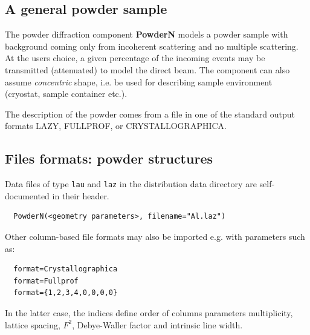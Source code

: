 \subsection*{A general powder sample}
\label{powder}


The powder diffraction component \textbf{PowderN} models a powder sample
with background coming only from incoherent scattering and no
multiple scattering. At the users choice, a given percentage of the incoming
events may be transmitted (attenuated) to model the direct beam. The component can also
assume \emph{concentric} shape, i.e. be used for describing sample environment (cryostat,
sample container etc.). 

The description of the powder comes from a file in one of the standard output formats LAZY, FULLPROF, or CRYSTALLOGRAPHICA.


\subsection{Files formats: powder structures}

Data files of type \verb'lau' and \verb'laz' in the \MCX distribution data directory are self-documented in their header. 
\begin{verbatim}
  PowderN(<geometry parameters>, filename="Al.laz")
\end{verbatim}
Other column-based file formats may also be imported e.g. with parameters such as:
\begin{verbatim}
  format=Crystallographica
  format=Fullprof
  format={1,2,3,4,0,0,0,0}
\end{verbatim}
In the latter case, the indices define order of columns parameters
multiplicity, lattice spacing, $F^2$, Debye-Waller factor and intrinsic line width.

